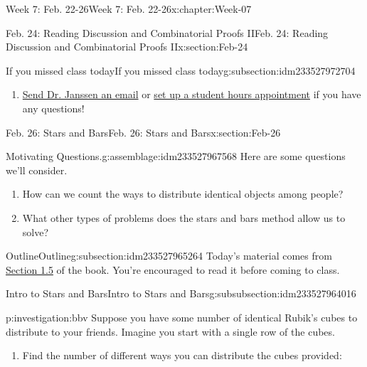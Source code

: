 \documentclass[oneside,10pt,]{book}
\numberwithin{equation}{section}
\begin{document}
\begin{chapterptx}{Week 7: Feb. 22-26}{}{Week 7: Feb. 22-26}{}{}{x:chapter:Week-07}
\begin{sectionptx}{Feb. 24: Reading Discussion and Combinatorial Proofs II}{}{Feb. 24: Reading Discussion and Combinatorial Proofs II}{}{}{x:section:Feb-24}
\begin{subsectionptx}{If you missed class today}{}{If you missed class today}{}{}{g:subsection:idm233527972704}
\begin{enumerate}
\item{}\href{mailto:mike.janssen@dordt.edu}{Send Dr. Janssen an email} or \href{https://calendly.com/mkjanssen/student-hours}{set up a student hours appointment} if you have any questions!%
\end{enumerate}
\end{subsectionptx}
\end{sectionptx}
%
%
\typeout{************************************************}
\typeout{************************************************}
%
\begin{sectionptx}{Feb. 26: Stars and Bars}{}{Feb. 26: Stars and Bars}{}{}{x:section:Feb-26}
\begin{introduction}{}%
\begin{assemblage}{Motivating Questions.}{g:assemblage:idm233527967568}%
Here are some questions we'll consider. %
\begin{enumerate}
\item{}How can we count the ways to distribute identical objects among people?%
\item{}What other types of problems does the stars and bars method allow us to solve?%
\end{enumerate}
%
\end{assemblage}
\end{introduction}%
%
%
\typeout{************************************************}
\typeout{************************************************}
%
\begin{subsectionptx}{Outline}{}{Outline}{}{}{g:subsection:idm233527965264}
Today's material comes from \href{http://discrete.openmathbooks.org/dmoi3/sec_stars-and-bars.html}{Section 1.5} of the book. You're encouraged to read it before coming to class.%
%
%
\typeout{************************************************}
\typeout{************************************************}
%
\begin{subsubsectionptx}{Intro to Stars and Bars}{}{Intro to Stars and Bars}{}{}{g:subsubsection:idm233527964016}
\begin{investigation}{}{p:investigation:bbv}%
Suppose you have some number of identical Rubik's cubes to distribute to your friends. Imagine you start with a single row of the cubes.%
\begin{enumerate}
\item{}Find the number of different ways you can distribute the cubes provided:%
\par

\end{enumerate}
\end{investigation}
\end{subsubsectionptx}
\end{subsectionptx}
\end{sectionptx}
\end{chapterptx}
\end{document}
